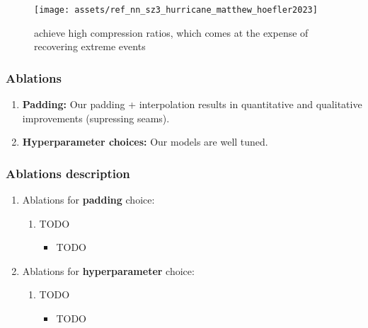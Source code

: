 \begin{enumerate}
\begin{enumerate}
        \begin{figure}[ht]
            \centering
            \texttt{[image: assets/ref\_nn\_sz3\_hurricane\_matthew\_hoefler2023]}
            \caption{\cite{hoefler2023earth} achieve high compression ratios, which comes at the expense of recovering extreme events }
            \label{fig:hurricane_matthew_hoefler2023earth}
        \end{figure}
    \end{enumerate}
\end{enumerate}


\subsubsection{Ablations}
\begin{enumerate}
    \item \textbf{Padding:} Our padding + interpolation results in quantitative and qualitative improvements (supressing seams).
    \item \textbf{Hyperparameter choices:} Our models are well tuned.
\end{enumerate}


\subsubsection{Ablations description}
\begin{enumerate}
    \item Ablations for \textbf{padding} choice:
    \begin{enumerate}
        \item TODO
        \begin{itemize}
            \item TODO
        \end{itemize}
    \end{enumerate}
    
    \item Ablations for \textbf{hyperparameter} choice:
    \begin{enumerate}
        \item TODO
        \begin{itemize}
            \item TODO
        \end{itemize} 
    \end{enumerate}
\end{enumerate}

